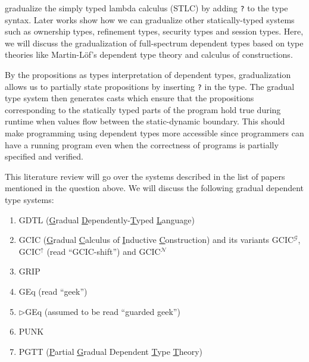 \documentclass{article}
\theoremstyle{definition}
\newcommand{\GCICN}[0]{GCIC\(^\mathcal{N}\)}
\newcommand{\GCICG}[0]{GCIC\(^\mathcal{G}\)}
\newcommand{\GCICS}[0]{GCIC\(^\uparrow\)}
\newcommand{\GGEq}[0]{\(\triangleright\)GEq}
\begin{document}
\citet{siek_gradual_2006} gradualize the simply typed lambda calculus (STLC) by
adding \verb|?| to the type syntax. Later works show how we can gradualize other
statically-typed systems such as ownership types\cite{sergey_gradual_2012},
refinement types\cite{lehmann_gradual_2017}, security
types\cite{fennell_gradual_2013}\cite{toro_type-driven_2018}\cite{chen_quest_2024}
and session types\cite{igarashi_gradual_2017}. Here, we will discuss the
gradualization of full-spectrum dependent types based on type theories like
Martin-L\"of’s dependent type theory\cite{martin-lof_intuitionistic_1984} and
calculus of constructions\cite{coquand_calculus_1988}.

By the propositions as types interpretation of dependent types, gradualization
allows us to partially state propositions by inserting \verb|?| in the type. The
gradual type system then generates casts which ensure that the propositions
corresponding to the statically typed parts of the program hold true during
runtime when values flow between the static-dynamic boundary. This should make
programming using dependent types more accessible since programmers can have a
running program even when the correctness of programs is partially specified and
verified.

This literature review will go over the systems described in the list of papers
mentioned in the question above. We will discuss the following gradual dependent
type systems:
\begin{enumerate}
  \item GDTL (\underline{G}radual \underline{D}ependently-\underline{T}yped
    \underline{L}anguage) \cite{eremondi_approximate_2019}\cite{eremondi_design_2023}
  \item GCIC (\underline{G}radual \underline{C}alculus of \underline{I}nductive
    \underline{C}onstruction) and its variants \GCICG{}, \GCICS{} (read
    ``GCIC-shift'') and \GCICN{}\cite{lennon-bertrand_gradualizing_2022}
  \item GRIP\cite{maillard_reasonably_2022}
  \item GEq (read
    ``geek'')\cite{eremondi_propositional_2022}\cite{eremondi_design_2023}
  \item \GGEq{}\cite{eremondi_design_2023} (assumed to be read
    ``guarded geek'')
  \item PUNK\cite{malewski_gradual_2024}
  \item PGTT (\underline{P}artial \underline{G}radual Dependent \underline{T}ype
    \underline{T}heory)\cite{shi_partial_2023}
\end{enumerate}
\end{document}

